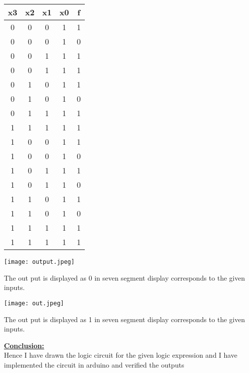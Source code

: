\documentclass[10pt,a4paper]{report}
\begin{document}
\begin{table}[ht]
\centering %
\begin{tabular}{c c c c c} %
\hline\hline %
x3 & x2 & x1 &x0 & f\\ [0.5ex] %
\hline
0 & 0 & 0 & 1 & 1 \\
0 & 0 & 0 & 1 & 0 \\
0 & 0 & 1 & 1 & 1 \\
0 & 0 & 1 & 1 & 1 \\
0 & 1 & 0 & 1 & 1 \\
0 & 1 & 0 & 1 & 0 \\
0 & 1 & 1 & 1 & 1 \\
1 & 1 & 1 & 1 & 1 \\
1 & 0 & 0 & 1 & 1 \\
1 & 0 & 0 & 1 & 0 \\
1 & 0 & 1 & 1 & 1 \\
1 & 0 & 1 & 1 & 0 \\
1 & 1 & 0 & 1 & 1 \\
1 & 1 & 0 & 1 & 0 \\
1 & 1 & 1 & 1 & 1 \\
1 & 1 & 1 & 1 & 1 \\
\hline
\end{tabular}
\end{table}
\raggedright \begin{center} \texttt{[image: output.jpeg]} \end{center} \begin{center} The out put is displayed as 0 in seven segment display corresponds to the given inputs. \end{center}
\vspace{5mm}
\raggedright \begin{center} \texttt{[image: out.jpeg]} \end{center}
\begin{center} The out put is displayed as 1 in seven segment display corresponds to the given inputs. \end{center}
\vspace{5mm}
\raggedright \textbf{\underline{Conclusion:}}\vspace{7mm}
\\ Hence I have drawn the logic circuit for the given logic expression and I have implemented the circuit in arduino and verified the outputs
\end{document}
